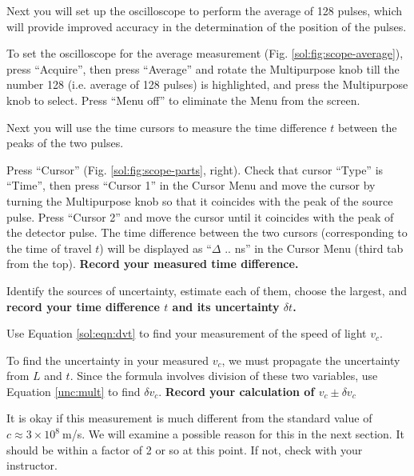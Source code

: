 Next you will set up the oscilloscope to perform the average of 128 pulses, which will provide improved accuracy in the determination of the position of the pulses.

\begin{steps}
	\item To set the oscilloscope for the average measurement (Fig. \ref{sol:fig:scope-average}), press “Acquire”, then press “Average” and rotate the Multipurpose knob till the number 128 (i.e. average of 128 pulses) is highlighted, and press the Multipurpose knob to select. Press “Menu off” to eliminate the Menu from the screen.
	
\end{steps}

Next you will use the time cursors to measure the time difference $t$ between the peaks of the two pulses.

\begin{steps}
	
	\item Press “Cursor” (Fig. \ref{sol:fig:scope-parts}, right). Check that cursor “Type” is “Time”, then press “Cursor 1” in the Cursor Menu and move the cursor by turning the Multipurpose knob so that it coincides with the peak of the source pulse. Press “Cursor 2” and move the cursor until it coincides with the peak of the detector pulse. The time difference between the two cursors (corresponding to the time of travel $t$) will be displayed as “$\Delta$ .. ns” in the Cursor Menu (third tab from the top). \textbf{Record your measured time difference.}
	
	\item Identify the sources of uncertainty, estimate each of them, choose the largest, and \textbf{record your time difference $t$ and its uncertainty $\delta t$.}

	\item Use Equation \ref{sol:eqn:dvt} to find your measurement of the speed of light $v_c$.

	\item To find the uncertainty in your measured $v_c$, we must propagate the uncertainty from $L$ and $t$. Since the formula involves division of these two variables, use Equation \ref{unc:mult} to find $\delta v_c$. \textbf{Record your calculation of $v_c \pm \delta v_c$}

\end{steps}

It is okay if this measurement is much different from the standard value of $c \approx 3 \times 10^8\:$m/s. We will examine a possible reason for this in the next section. It should be within a factor of 2 or so at this point. If not, check with your instructor.

